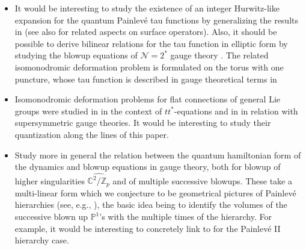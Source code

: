 \documentclass[12pt,a4paper]{article}
\numberwithin{equation}{section}
\begin{document}
\begin{itemize}

    \item 
     It would be interesting to study the existence of an integer Hurwitz-like expansion for the quantum Painlev\'e tau functions by generalizing the results in \cite{Bonelli:2024wha,Bonelli:2025juz} (see also \cite{Fucito:2023txg,Francois:2023trm} for related aspects on surface operators).
     Also, it should be possible to derive bilinear relations for the tau function in elliptic form by studying the blowup equations of $\mathcal{N}=2^*$ gauge theory \cite{Bershtein:2021uts,Bonelli:2025bmt}. The related isomonodromic deformation problem is formulated on the torus with one puncture, whose tau function is described in gauge theoretical terms in \cite{Bonelli:2019boe}

     \item Isomonodromic deformation problems for flat connections of general Lie groups were studied in \cite{Guest2012IsomonodromyAO} in the context of $tt^*$-equations and in \cite{Bonelli:2021rrg,Bonelli:2022iob} in relation with supersymmetric gauge theories. It would be interesting to study their quantization along the lines of this paper. 
     
     \item Study more in general the relation between the quantum hamiltonian form of the dynamics and blowup equations in gauge theory, both for blowup of higher singularities $\widehat{\mathbb{C}^2/\mathbb{Z}_p}$ and of multiple successive blowups. These take a multi-linear form which we conjecture to be  geometrical pictures of Painlev\'e hierarchies (see, e.g., \cite{Mazzocco_2007}), the basic idea being to identify the volumes of the successive blown up $\mathbb{P}^1$'s with the multiple times of the hierarchy. For example, it would be interesting to concretely link to \cite{Mazzocco_2007,Bobrova_2021}
     for the Painlev\'e II hierarchy case.
    
\end{itemize}

\printbibliography[
heading=bibintoc,
title={References}
]
\end{document}

